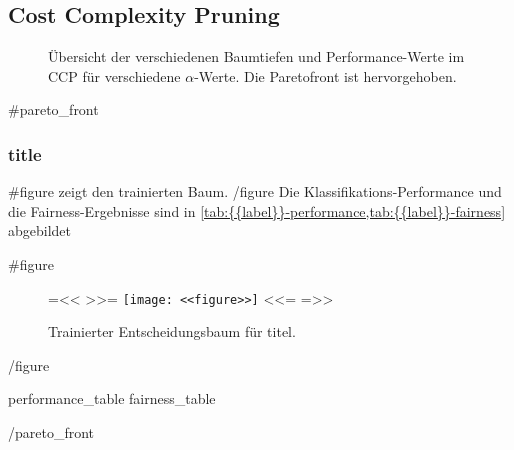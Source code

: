 \subsection{Cost Complexity Pruning}

\begin{figure}[ht]
  \centering
  \caption{Übersicht der verschiedenen Baumtiefen und Performance-Werte
    im CCP für verschiedene \(\alpha\)-Werte. Die Paretofront ist
    hervorgehoben.}
\end{figure}

{{#pareto_front}}
\clearpage
\subsubsection{ {{title}} }
{{#figure}}
 zeigt den trainierten Baum.
{{/figure}}
Die Klassifikations-Performance und die Fairness-Ergebnisse sind in
\cref{tab:{{label}}-performance,tab:{{label}}-fairness}
abgebildet

{{#figure}}
\begin{figure}[ht]
  {{=<< >>=}}
  \texttt{[image: <<figure>>]}
  <<={{ }}=>>
  \caption{Trainierter Entscheidungsbaum für {{titel}}.}
  \label{fig:{{label}}-tree}
\end{figure}
{{/figure}}


{{{performance_table}}}
{{{fairness_table}}}

{{/pareto_front}}
